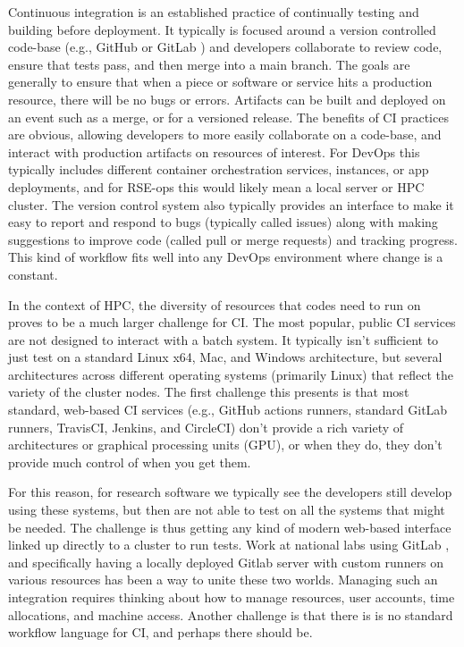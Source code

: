 Continuous integration is an established practice of continually testing and building before deployment.
It typically is focused around a version controlled code-base (e.g., GitHub or GitLab \cite{github,gitlab}) and developers collaborate to review code, ensure that tests pass, and then merge into a main branch. The goals are generally to ensure that when a piece or software or service hits a production resource, there will be no bugs or errors. Artifacts can be built and deployed on an event such as a merge, or for a versioned release. The benefits of CI practices are obvious, allowing developers to more easily collaborate on a code-base, and interact with production artifacts on resources of interest. For DevOps this typically includes different container orchestration services, instances, or app deployments, and for RSE-ops this would likely mean a local server or HPC cluster. The version control system also typically provides an interface to make it easy to report and respond to bugs (typically called issues) along with making suggestions to improve code (called pull or merge requests) and tracking progress.
This kind of workflow fits well into any DevOps environment where change is a constant.

In the context of HPC, the diversity of resources that codes need to run on proves to be a much larger challenge for CI. The most popular, public CI services are not designed to interact with a batch system. It typically isn't sufficient to just test on a standard Linux x64, Mac, and Windows architecture, but several architectures across different operating systems (primarily Linux) that reflect the variety of the cluster nodes. The first challenge this presents is that most standard, web-based CI services (e.g., GitHub actions runners, standard GitLab runners, TravisCI, Jenkins, and CircleCI) don't provide a rich variety of architectures or graphical processing units (GPU), or when they do, they don't provide much control of when you get them.

For this reason, for research software we typically see the developers still develop using these systems, but then are not able to test on all the systems that might be needed.
The challenge is thus getting any kind of modern web-based interface linked up directly to a cluster to run tests. Work at national labs using GitLab \cite{Mendoza_undated-lz,noauthor_undated-fv}, and specifically having a locally deployed Gitlab server with custom runners on various resources \cite{noauthor_undated-jd} has been a way to unite these two worlds.
Managing such an integration requires thinking about how to manage resources, user accounts, time allocations, and machine access. Another challenge is that there is is no standard workflow language for CI, and perhaps there should be.
